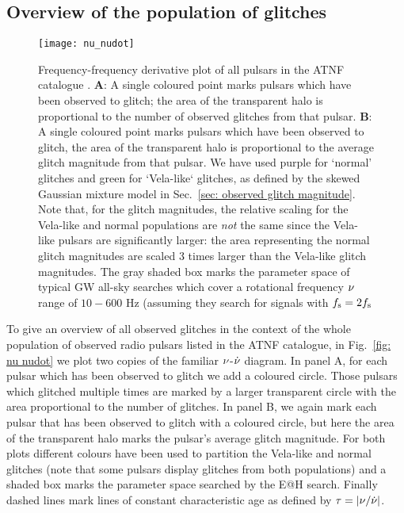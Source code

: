 \documentclass[../full_thesis/full_thesis.tex]{subfiles}
\begin{document}
\subsection{Overview of the population of glitches}
\label{sec: overview of the population of glitches}
\begin{figure*}[htb]
\centering
\texttt{[image: nu\_nudot]}
\caption{Frequency-frequency derivative plot of all pulsars in the ATNF
catalogue \citep{ATNF}. \textbf{A}: A single coloured point marks pulsars which have been
observed to glitch; the area of the transparent halo is proportional to the
number of observed glitches from that pulsar. \textbf{B}: A single coloured
point marks pulsars which have been observed to glitch, the area of the transparent
halo is proportional to the average glitch magnitude from that pulsar. We have used
purple for `normal' glitches and green for `Vela-like` glitches, as defined by
the skewed Gaussian mixture model in Sec.~\ref{sec: observed glitch magnitude}. Note
that, for the glitch magnitudes, the relative scaling for the Vela-like and
normal populations are \emph{not}
the same since the Vela-like pulsars are significantly larger: the area representing
the normal glitch magnitudes are scaled 3 times larger than the Vela-like glitch
magnitudes.
The gray shaded box marks the parameter space of typical GW all-sky searches which
cover a rotational frequency $\nu$ range of $10-600$ Hz (assuming they search for signals
with $f_{\textrm{s}}=2f_{\textrm{s}}$}
\label{fig: nu nudot}
\end{figure*}

To give an overview of all observed glitches in the context of the whole population of
observed radio pulsars listed in the ATNF catalogue, in Fig.~\ref{fig: nu
nudot} we plot two copies of the familiar $\nu$-$\dot{\nu}$ diagram. In panel A, for each
pulsar which has been observed to glitch we add a coloured circle. Those
pulsars which glitched multiple times are marked by a larger transparent circle
with the area proportional to the number of glitches. In panel B, we again mark
each pulsar that has been observed to glitch with a coloured circle, but here
the area of the transparent halo marks the pulsar's average glitch magnitude.
For both plots different
colours have been used to partition the Vela-like and normal glitches (note that some
pulsars display glitches from both populations) and a shaded box marks the
parameter space searched by the E@H search. Finally dashed lines mark lines
of constant characteristic age as defined by $\tau = \left|\nu/\dot{\nu}\right|$.
\end{document}
